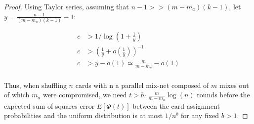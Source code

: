 \documentclass[USenglish,oneside,twocolumn]{article}
\begin{document}
\begin{proof}
Using Taylor series, assuming that $n-1>>(m-m_a)(k-1)$, let $y = \frac{n-1}{(m-m_a)(k-1)}-1$:

\begin{align*}
c&> 1 / \log(1+ \frac{1}{y})\\
c&> \left( \frac{1}{y} +o\left(\frac{1}{y}\right)\right)^{-1}\\
c&> y -  o\left(1\right)\simeq \frac{m}{m-m_a} -o(1)\\
\end{align*}

Thus, when shuffling $n$ cards with n a parallel mix-net composed of $m$ mixes out of which $m_a$ were compromised, we need $t>b\cdot \frac{m}{m-m_a} \log(n) $ rounds before the expected sum of squares error $E[\Phi(t)]$ between the card assignment probabilities and the uniform distribution is at most $1/n^b$ for any fixed $b>1$.
\end{proof}
\end{document}
